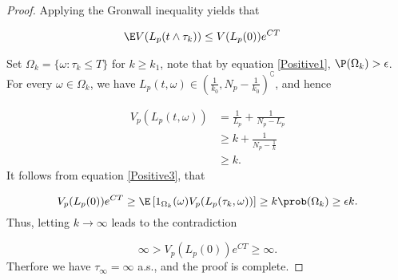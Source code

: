 \begin{proof}
	Applying the Gronwall inequality yields that
	
	\begin{align}\label{Positive3}
		\E V(L_p(t\wedge\tau_k))&\leq V(L_p(0))e^{CT}
	\end{align}

	Set $\Omega_k = \{\omega : \tau_k\leq T\}$ for $k\geq k_1$, note that by equation \eqref{Positive1}, $\P(\Omega_k)> \epsilon$. For every $\omega \in \Omega_k$, we have $L_p(t,\omega)\in \left(\frac{1}{k_0},N_p-\frac{1}{k_0}\right)^{\complement}$, and hence
	
	\begin{align*}
		V_p(L_p(t,\omega))
			&=
				\frac{1}{L_p}+\frac{1}{N_p-L_p}\\
			&\geq 
				k +\frac{1}{N_p-\frac{1}{k}}\\
			&\geq k.
	\end{align*}
%	
	It follows from equation \eqref{Positive3}, that
	
	\begin{equation*}
		V_p(L_p(0)) e^{CT}
			\geq 
			\E 
			\left[
				1_{\Omega_k} (\omega)
				V_p(L_p(\tau_k,\omega))
			\right]
			\geq k
			\prob (\Omega_k)\geq \epsilon k.
	\end{equation*}
%
	Thus, letting $k\rightarrow \infty$ leads to the contradiction

	\begin{equation*}
		\infty>V_p(L_p(0))e^{CT}\geq \infty.	
	\end{equation*}
%
	Therfore we  have $\tau_\infty=\infty$ a.s., and the proof is 
	complete.	
\end{proof}
